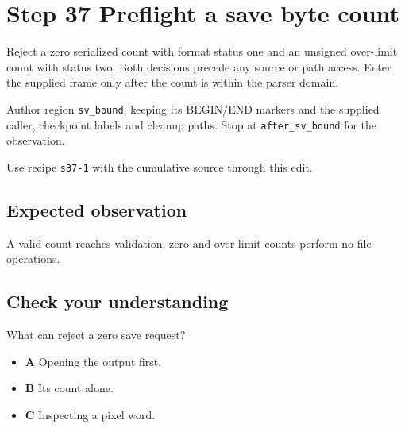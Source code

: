 \section{Step 37 Preflight a save byte count}\label{ppm-s37}

Reject a zero serialized count with format status one and an unsigned over-limit count with status two. Both decisions precede any source or path access. Enter the supplied frame only after the count is within the parser domain.

Author region \texttt{sv\_bound}, keeping its BEGIN/END markers and the supplied caller, checkpoint labels and cleanup paths. Stop at \texttt{after\_sv\_bound} for the observation.

Use recipe \texttt{s37-1} with the cumulative source through this edit.

\subsection{Expected observation}
A valid count reaches validation; zero and over-limit counts perform no file operations.

\subsection{Check your understanding}
What can reject a zero save request?

\begin{itemize}
  \item \textbf{A} Opening the output first.
  \item \textbf{B} Its count alone.
  \item \textbf{C} Inspecting a pixel word.
\end{itemize}
